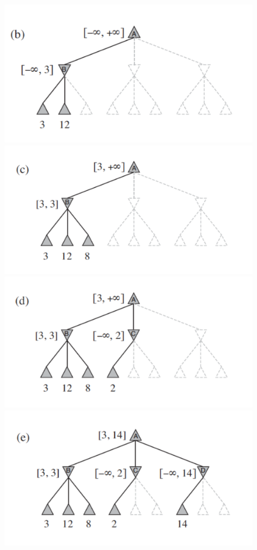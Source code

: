 \documentclass{article}
\begin{document}
\begin{figure}[h!]
\centering
\includegraphics[scale=0.2]{Images/alfabetaaction1.png}
\includegraphics[scale=0.2]{Images/alfabetaaction2.png}
\includegraphics[scale=0.2]{Images/alfabetaaction3.png}
\includegraphics[scale=0.2]{Images/alfabetaaction4.png}

\end{figure}
\end{document}
